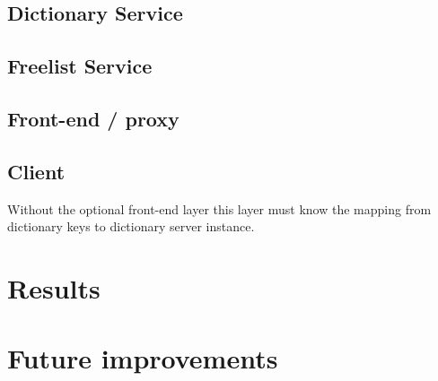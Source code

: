 \documentclass[12pt,a4paper]{scrartcl}
\begin{document}

\subsection{Dictionary Service}

\subsection{Freelist Service}


\subsection{Front-end / proxy}
\subsection{Client}
Without the optional front-end layer this layer must know the mapping from dictionary keys to dictionary server instance.

\section{Results}

\section{Future improvements}







\nocite{*}
\end{document}
